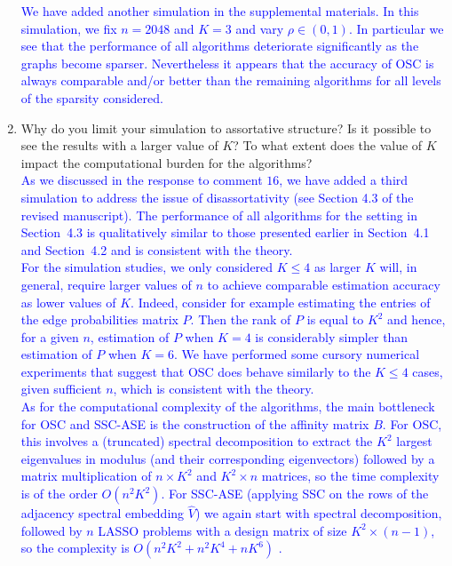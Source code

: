 \documentclass[
]{article}
\begin{document}
\begin{enumerate}
  \textcolor{blue}{
  We have added another simulation in the supplemental materials. 
  In this simulation, we fix $n = 2048$ and $K = 3$ and vary $\rho \in
  (0, 1)$. In particular we see that the performance of all algorithms
  deteriorate significantly as the graphs become sparser. Nevertheless
  it appears that the accuracy of OSC is always comparable and/or better
  than the remaining algorithms for all levels of the sparsity
  considered.
  }
\item
  Why do you limit your simulation to assortative structure? Is it
  possible to see the results with a larger value of \(K\)? To what
  extent does the value of \(K\) impact the computational burden for the
  algorithms?\\
  \textcolor{blue}{
  As we discussed in the response to comment
  $16$, we have added a third simulation to address the issue of disassortativity (see Section
  4.3 of the revised manuscript). The performance of all algorithms
  for the setting in Section~4.3 is qualitatively similar to those
  presented earlier in Section~4.1 and Section~4.2 and is consistent with the theory. 
  }\\
  \textcolor{blue}{
  For the simulation studies, we only considered $K \leq 4$ as larger $K$ will, 
  in general, require larger values of $n$ to achieve comparable estimation accuracy as lower values of $K$. 
  Indeed, consider for example estimating the entries of the edge probabilities matrix $P$. 
  Then the rank of $P$ is equal to $K^2$ and hence, for a given $n$, estimation of $P$ when $K = 4$ is considerably simpler than estimation of $P$ when $K = 6$. 
  We have performed some cursory numerical experiments that suggest that OSC does behave similarly to the $K \leq 4$ cases, given sufficient $n$, which is consistent with the theory. 
  }\\
  \textcolor{blue}{
  As for the computational complexity of the algorithms, 
  the main bottleneck for OSC and
  SSC-ASE is the construction of the affinity matrix $B$. 
  For OSC, this involves a (truncated) spectral decomposition to extract the
  $K^2$ largest eigenvalues in modulus (and their corresponding
  eigenvectors) followed by a matrix multiplication of $n \times K^2$
  and $K^2 \times n$ matrices, so the time complexity is of the order $O(n^2 K^2)$. 
  For SSC-ASE (applying SSC on the rows of the adjacency spectral
  embedding $\hat{V}$) we again start with spectral decomposition, followed by
  $n$ LASSO problems with a design matrix of size 
  $K^2 \times (n - 1)$, so the complexity is $O(n^2 K^2 + n^2 K^4 + n K^6)$ \cite{10.1214/009053604000000067}. 
}
\end{enumerate}
\end{document}

